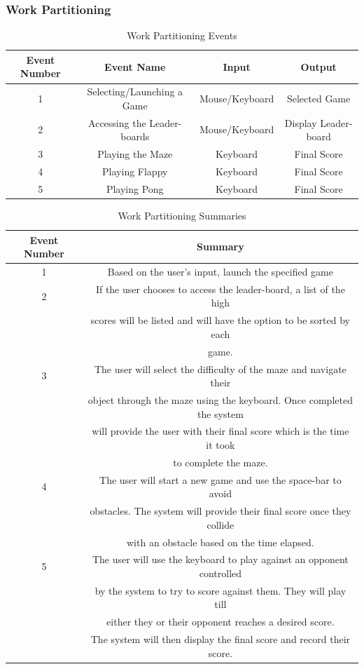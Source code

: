 \documentclass[12pt, titlepage]{article}
\begin{document}
\subsubsection{Work Partitioning}

\begin{table}[H]
\caption{Work Partitioning Events}
\begin{center}
\begin{tabular}{|c|c|c|c|}
\hline
Event Number & Event Name & Input & Output \\
\hline
1 & Selecting/Launching a Game & Mouse/Keyboard & Selected Game \\
\hline
2 & Accessing the Leader-boards & Mouse/Keyboard & Display Leader-board\\
\hline
3 & Playing the Maze & Keyboard & Final Score\\
\hline
4 & Playing Flappy & Keyboard & Final Score\\
\hline
5 & Playing Pong & Keyboard & Final Score\\
\hline
\end{tabular}
\end{center}
\label{default}
\end{table}%

\begin{table}[H]
\caption{Work Partitioning Summaries}
\begin{center}
\begin{tabular}{|c|c|}
\hline
Event Number & Summary\\
\hline
1 & Based on the user’s input, launch the specified game\\
\hline
2 & If the user chooses to access the leader-board, a list of the high\\ &scores will be listed and will have the option to be sorted by each\\ &game.\\
\hline
3 & The user will select the difficulty of the maze and navigate their\\ &object through the maze using the keyboard. Once completed the system\\ &will provide the user with their final score which is the time it took\\ &to complete the maze.\\
\hline
4 & The user will start a new game and use the space-bar to avoid\\ &obstacles. The system will provide their final score once they collide\\ &with an obstacle based on the time elapsed.\\
\hline
5 & The user will use the keyboard to play against an opponent controlled\\ &by the system to try to score against them. They will play till\\ &either they or their opponent reaches a desired score. \\&The system will then display the final score and record their score.\\
\hline
\end{tabular}
\end{center}
\label{default}
\end{table}%
\end{document}
